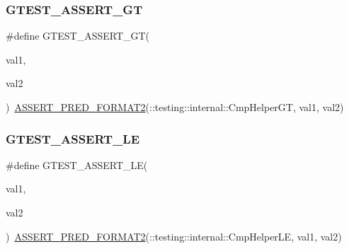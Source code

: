 \mbox{\label{_obj__test_2lib_2googletest-master_2googletest_2include_2gtest_2gtest_8h_a088b9056fd1c1f316b41c22f64deb33a}} 
\subsubsection{\texorpdfstring{GTEST\_ASSERT\_GT}{GTEST\_ASSERT\_GT}}
{\footnotesize\ttfamily \#define G\+T\+E\+S\+T\+\_\+\+A\+S\+S\+E\+R\+T\+\_\+\+GT(\begin{DoxyParamCaption}\item[{}]{val1,  }\item[{}]{val2 }\end{DoxyParamCaption})~\mbox{\hyperlink{_obj__test_2lib_2googletest-release-1_88_81_2googletest_2include_2gtest_2gtest__pred__impl_8h_ac452685a1a98ea3d96eb956a062ee210}{A\+S\+S\+E\+R\+T\+\_\+\+P\+R\+E\+D\+\_\+\+F\+O\+R\+M\+A\+T2}}(\+::testing\+::internal\+::\+Cmp\+Helper\+GT, val1, val2)}

\mbox{\label{_obj__test_2lib_2googletest-master_2googletest_2include_2gtest_2gtest_8h_abef04dcd4a0259d378de7b3b3ffb6730}} 
\subsubsection{\texorpdfstring{GTEST\_ASSERT\_LE}{GTEST\_ASSERT\_LE}}
{\footnotesize\ttfamily \#define G\+T\+E\+S\+T\+\_\+\+A\+S\+S\+E\+R\+T\+\_\+\+LE(\begin{DoxyParamCaption}\item[{}]{val1,  }\item[{}]{val2 }\end{DoxyParamCaption})~\mbox{\hyperlink{_obj__test_2lib_2googletest-release-1_88_81_2googletest_2include_2gtest_2gtest__pred__impl_8h_ac452685a1a98ea3d96eb956a062ee210}{A\+S\+S\+E\+R\+T\+\_\+\+P\+R\+E\+D\+\_\+\+F\+O\+R\+M\+A\+T2}}(\+::testing\+::internal\+::\+Cmp\+Helper\+LE, val1, val2)}

\mbox{\label{_obj__test_2lib_2googletest-master_2googletest_2include_2gtest_2gtest_8h_a5a75667e637febd18e5f7d4f3abf55e8}} 
